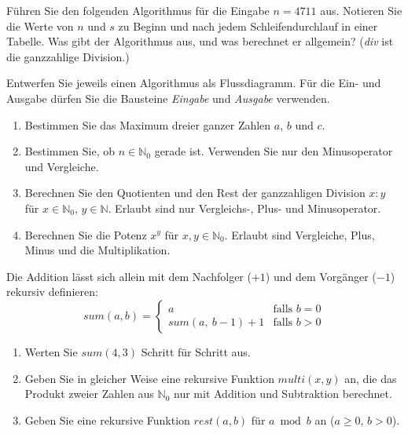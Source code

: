 Führen Sie den folgenden Algorithmus für die Eingabe $n = 4711$ aus. Notieren Sie die Werte von $n$ und $s$ zu Beginn und nach jedem Schleifendurchlauf in einer Tabelle. Was gibt der Algorithmus aus, und was berechnet er allgemein? (\emph{div} ist die ganzzahlige Division.)
\begin{center}
\end{center}

Entwerfen Sie jeweils einen Algorithmus als Flussdiagramm. Für die Ein- und Ausgabe dürfen Sie die Bausteine \emph{Eingabe} und \emph{Ausgabe} verwenden.
\begin{enumerate}[label=\alph*)]
\item Bestimmen Sie das Maximum dreier ganzer Zahlen $a$, $b$ und $c$.
\item Bestimmen Sie, ob $n \in \mathbb{N}_0$ gerade ist. Verwenden Sie nur den Minusoperator und Vergleiche.
\item Berechnen Sie den Quotienten und den Rest der ganzzahligen Division $x : y$ für $x \in \mathbb{N}_0$, $y \in \mathbb{N}$. Erlaubt sind nur Vergleichs-, Plus- und Minusoperator.
\item Berechnen Sie die Potenz $x^y$ für $x, y \in \mathbb{N}_0$. Erlaubt sind Vergleiche, Plus, Minus und die Multiplikation.
\end{enumerate}

Die Addition lässt sich allein mit dem Nachfolger ($+1$) und dem Vorgänger ($-1$) rekursiv definieren:
\[
\mathit{sum}(a, b) =
\begin{cases}
a & \text{falls } b = 0 \\
\mathit{sum}(a,\ b - 1) + 1 & \text{falls } b > 0
\end{cases}
\]
\begin{enumerate}[label=\alph*)]
\item Werten Sie $\mathit{sum}(4, 3)$ Schritt für Schritt aus.
\item Geben Sie in gleicher Weise eine rekursive Funktion $\mathit{multi}(x, y)$ an, die das Produkt zweier Zahlen aus $\mathbb{N}_0$ nur mit Addition und Subtraktion berechnet.
\item Geben Sie eine rekursive Funktion $\mathit{rest}(a, b)$ für $a \bmod b$ an ($a \geq 0$, $b > 0$).
\end{enumerate}


